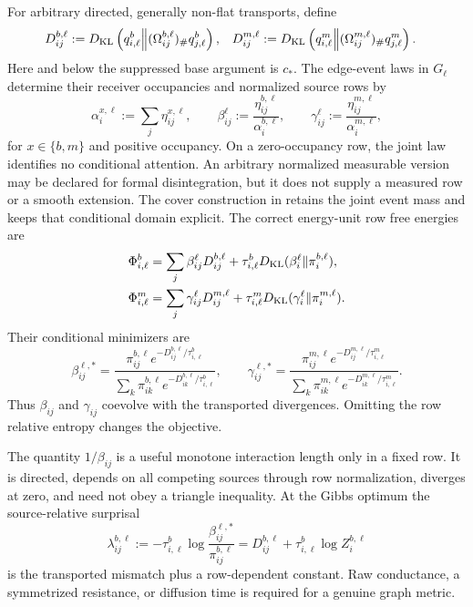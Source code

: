 For arbitrary directed, generally non-flat transports, define
\begin{align}
D_{ij}^{b,\ell}
&:=D_{\mathrm{KL}}\left(q_{i,\ell}^b\middle\Vert
(\Omega_{ij}^{b,\ell})_\#q_{j,\ell}^b\right),
&
D_{ij}^{m,\ell}
&:=D_{\mathrm{KL}}\left(q_{i,\ell}^m\middle\Vert
(\Omega_{ij}^{m,\ell})_\#q_{j,\ell}^m\right).
\label{eq:full-graph-transported-divergences}
\end{align}
Here and below the suppressed base argument is $c_*$. The edge-event laws in
$G_\ell$ determine their receiver occupancies and normalized source rows by
\begin{equation}
\alpha_i^{x,\ell}:=\sum_j\eta_{ij}^{x,\ell},
\qquad
\beta_{ij}^\ell:=\frac{\eta_{ij}^{b,\ell}}{\alpha_i^{b,\ell}},
\qquad
\gamma_{ij}^\ell:=\frac{\eta_{ij}^{m,\ell}}{\alpha_i^{m,\ell}},
\label{eq:full-graph-edge-event-disintegration}
\end{equation}
for $x\in\{b,m\}$ and positive occupancy. On a zero-occupancy row, the joint law identifies no conditional attention.
An arbitrary normalized measurable version may be declared for formal
disintegration, but it does not supply a measured row or a smooth extension.
The cover construction in  retains the joint
event mass and keeps that conditional domain explicit.
The correct energy-unit row free energies are
\begin{align}
\Phi_{i,\ell}^b
&=\sum_j\beta_{ij}^\ell D_{ij}^{b,\ell}
+\tau_{i,\ell}^bD_{\mathrm{KL}}(\beta_i^\ell\Vert\pi_i^{b,\ell}),
\nonumber\\
\Phi_{i,\ell}^m
&=\sum_j\gamma_{ij}^\ell D_{ij}^{m,\ell}
+\tau_{i,\ell}^mD_{\mathrm{KL}}(\gamma_i^\ell\Vert\pi_i^{m,\ell}).
\label{eq:full-graph-row-free-energies}
\end{align}
Their conditional minimizers are
\begin{equation}
\beta_{ij}^{\ell,*}
=\frac{\pi_{ij}^{b,\ell}e^{-D_{ij}^{b,\ell}/\tau_{i,\ell}^b}}
{\sum_k\pi_{ik}^{b,\ell}e^{-D_{ik}^{b,\ell}/\tau_{i,\ell}^b}},
\qquad
\gamma_{ij}^{\ell,*}
=\frac{\pi_{ij}^{m,\ell}e^{-D_{ij}^{m,\ell}/\tau_{i,\ell}^m}}
{\sum_k\pi_{ik}^{m,\ell}e^{-D_{ik}^{m,\ell}/\tau_{i,\ell}^m}}.
\label{eq:full-graph-gibbs-rows}
\end{equation}
Thus $\beta_{ij}$ and $\gamma_{ij}$ coevolve with the transported divergences.
Omitting the row relative entropy changes the objective. 

The quantity $1/\beta_{ij}$ is a useful monotone interaction length only in a
fixed row. It is directed, depends on all competing sources through row
normalization, diverges at zero, and need not obey a triangle inequality. At
the Gibbs optimum the source-relative surprisal
\begin{equation}
\lambda_{ij}^{b,\ell}:=-\tau_{i,\ell}^b
\log\frac{\beta_{ij}^{\ell,*}}{\pi_{ij}^{b,\ell}}
=D_{ij}^{b,\ell}+\tau_{i,\ell}^b\log Z_i^{b,\ell}
\label{eq:full-graph-attention-length}
\end{equation}
is the transported mismatch plus a row-dependent constant. Raw conductance,
a symmetrized resistance, or diffusion time is required for a genuine graph
metric. 

